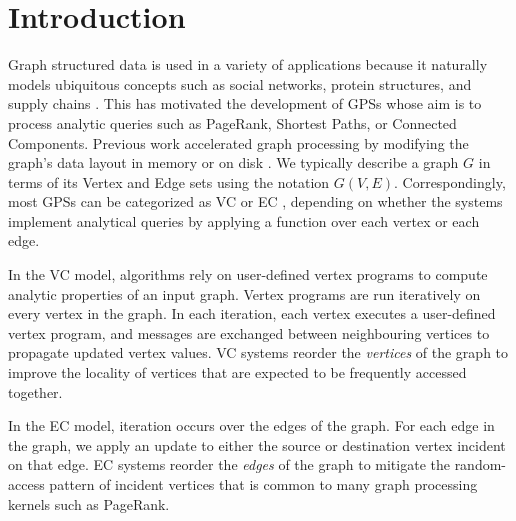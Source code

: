 
\chapter{Introduction}
\label{ch:Introduction}



\par Graph structured data is used in a variety of applications because it naturally models ubiquitous concepts such as social networks, protein structures, and supply chains \cite{heidari2018scalable, yan2011applications}. This has motivated the development of \acp{GPS} whose aim is to process analytic queries such as PageRank, Shortest Paths, or Connected Components. Previous work accelerated graph processing by modifying the graph's data layout in memory \cite{rabbit, dbg, cost} or on disk \cite{mosaic, basc}. We typically describe a graph $G$ in terms of its Vertex and Edge sets using the notation $G(V, E)$. Correspondingly, most \acp{GPS} can be categorized as \ac{VC} \cite{graphchi,flashgraph, basc} or \ac{EC} \cite{xstream}, depending on whether the systems implement analytical queries by applying a function over each vertex or each edge. 

\par In the \ac{VC} model, algorithms rely on user-defined vertex programs to compute analytic properties of an input graph. Vertex programs are run iteratively on every vertex in the graph. In each iteration, each vertex executes a user-defined vertex program, and messages are exchanged between neighbouring vertices to propagate updated vertex values. \ac{VC} systems reorder the \textit{vertices} of the graph to improve the locality of vertices that are expected to be frequently accessed together. 

\par In the \ac{EC} model, iteration occurs over the edges of the graph. For each edge in the graph, we apply an update to either the source or destination vertex incident on that edge. \ac{EC} systems reorder the \textit{edges} of the graph to mitigate the random-access pattern of incident vertices that is common to many graph processing kernels such as PageRank.

